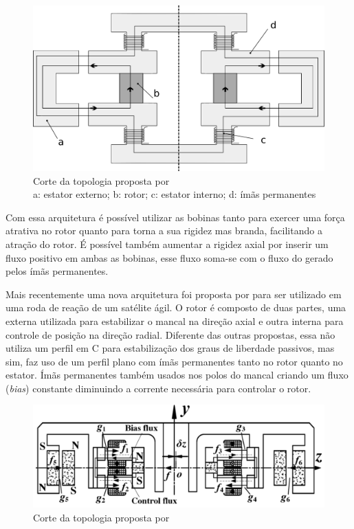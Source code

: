 
\begin{figure}[!ht]
	\centering
	\includegraphics[width=1\linewidth]{./Figs/mancais/alemao}
	\caption{Corte da topologia proposta por \cite{Scharfe2001} \\
	a: estator externo; b: rotor; c: estator interno; d: ímãs permanentes}
	\label{Fig:modelo:alemao}
\end{figure} 

Com essa arquitetura é possível utilizar as bobinas tanto para exercer uma força atrativa no rotor quanto para torna a sua rigidez mas branda, facilitando a atração do rotor. É possível também aumentar a rigidez axial por inserir um fluxo positivo em ambas as bobinas, esse fluxo soma-se com o fluxo do gerado pelos ímãs permanentes.

Mais recentemente uma nova arquitetura foi proposta por \citet{Bangcheng2012} para ser utilizado em uma roda de reação de um satélite ágil.  O rotor é composto de duas partes, uma externa utilizada para estabilizar o mancal na direção axial e outra interna para controle de posição na direção radial. Diferente das outras propostas, essa não utiliza um perfil em C para estabilização dos graus de liberdade passivos, mas sim, faz uso de um perfil plano com ímãs permanentes tanto no rotor quanto no estator.  Ímãs permanentes também usados nos polos do mancal criando um fluxo (\textit{bias}) constante diminuindo a corrente necessária para controlar o rotor.
 
\begin{figure}[!ht]
	\centering
	\includegraphics[width=1\linewidth]{./Figs/mancais/chines}
	\caption{Corte da topologia proposta por \cite{Bangcheng2012}}
	\label{Fig:modelo:chines}
\end{figure}

